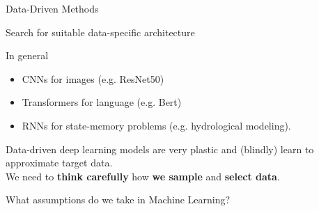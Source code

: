 \documentclass[11pt]{beamer}
\begin{document}
	\begin{frame}[t]{Data-Driven Methods}
		\centering
		\featurelearningtikz
		
		\raggedright
		\hspace{-1em} Search for suitable data-specific architecture
			
			{ 
					
					
					\vspace{1em}
					
					In general
						\begin{itemize}
							\item CNNs for images (e.g. ResNet50)
							\item Transformers for language (e.g. Bert)
							\item RNNs for state-memory problems (e.g. hydrological modeling).
						\end{itemize}
					
				
			}
		\pause
		\vspace{2em}
			\raggedright
			{Data-driven deep learning models are very plastic and (blindly) learn to approximate target data.}\\
			\pause
			\vspace{1em}
			We need to \textbf{think carefully} how \textbf{we sample} and \textbf{select data}. 
			
	\end{frame}

	\begin{frame}[plain]
		\centering
		\hfill
		\Large
		
		What assumptions do we take in Machine Learning?
		
		
		\hfill
\end{frame}
\end{document}
